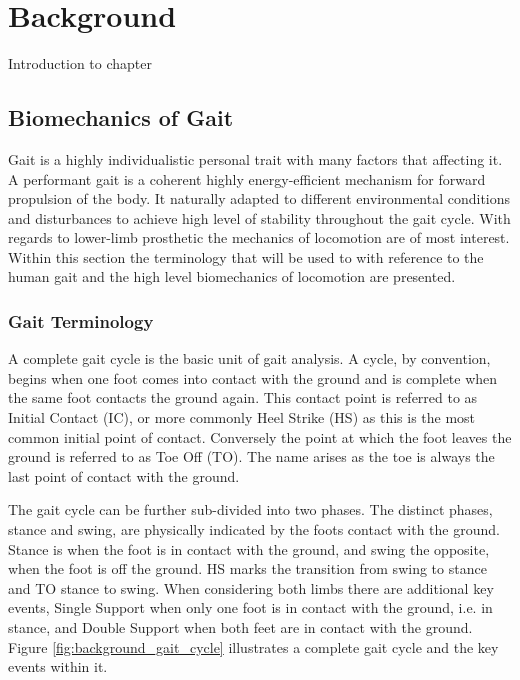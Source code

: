 \chapter{Background}
Introduction to chapter

\section{Biomechanics of Gait}
Gait is a highly individualistic personal trait with many factors that affecting it\cite{Horst2019}. A performant gait is a coherent highly energy-efficient mechanism for forward propulsion of the body. It naturally adapted to different environmental conditions and disturbances to achieve high level of stability throughout the gait cycle\cite{Shah2020, Mummolo2013}. With regards to lower-limb prosthetic the mechanics of locomotion are of most interest. Within this section the terminology that will be used to with reference to the human gait and the high level biomechanics of locomotion are presented.

\subsection{Gait Terminology}
A complete gait cycle is the basic unit of gait analysis. A cycle, by convention, begins when one foot comes into contact with the ground and is complete when the same foot contacts the ground again. This contact point is referred to as Initial Contact (IC), or more commonly Heel Strike (HS) as this is the most common initial point of contact. Conversely the point at which the foot leaves the ground is referred to as Toe Off (TO). The name arises as the toe is always the last point of contact with the ground.\cite{Novacheck1998, Shah2020}

The gait cycle can be further sub-divided into two phases. The distinct phases, stance and swing, are physically indicated by the foots contact with the ground. Stance is when the foot is in contact with the ground, and swing the opposite, when the foot is off the ground. HS marks the transition from swing to stance and TO stance to swing. When considering both limbs there are additional key events, Single Support when only one foot is in contact with the ground, i.e. in stance, and Double Support when both feet are in contact with the ground. Figure \ref{fig:background_gait_cycle} illustrates a complete gait cycle and the key events within it.\cite{Novacheck1998, Shah2020}

